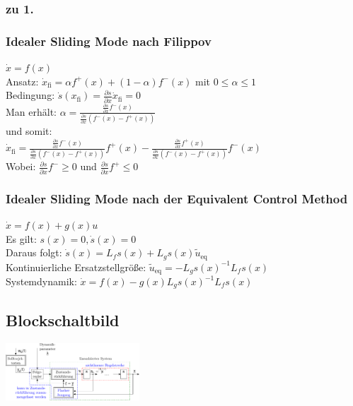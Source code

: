 \documentclass[german]{latex4ei/latex4ei_sheet}
\begin{document}
\begin{sectionbox}
\subsubsection{zu 1.}


\subsubsection{Idealer Sliding Mode nach Filippov}
$\dot{x} = f(x)$\\
Ansatz: $\dot{x}_\text{fi} = \alpha f^+(x) + (1-\alpha) f^-(x)$ mit $0 \leq \alpha \leq 1$ \\
Bedingung: $\dot{s}(x_\text{fi}) = \frac{\partial s}{\partial x} \dot{x}_\text{fi} = 0$ \\
Man erhält: $\alpha = \frac{ \frac{\partial s}{\partial x} f^-(x)  }{ \frac{\partial s}{\partial x} (f^-(x) - f^+(x))  }$ \\
und somit:\\ $\dot{x}_\text{fi} = \frac{ \frac{\partial s}{\partial x} f^-(x)  }{ \frac{\partial s}{\partial x} (f^-(x) - f^+(x)) } f^+(x) -
\frac{ \frac{\partial s}{\partial x} f^+(x)  }{ \frac{\partial s}{\partial x} (f^-(x) - f^+(x)) } f^-(x)$ \\
Wobei: $\frac{\partial s}{\partial x}f^- \geq 0$ und $\frac{\partial s}{\partial x}f^+ \leq 0$ \\

\subsubsection{Idealer Sliding Mode nach der Equivalent Control Method}
$\dot{x} = f(x) + g(x)u$ \\
Es gilt: $s(x) = 0, \dot{s}(x) = 0$ \\
Daraus folgt: $\dot{s}(x) = L_f s(x) + L_g s(x) \tilde{u}_\text{eq}$ \\
Kontinuierliche Ersatzstellgröße: $\tilde{u}_\text{eq} = -L_g s(x) ^{-1} L_f s(x)$ \\
Systemdynamik: $\dot{x} = f(x) - g(x) L_g s(x)^{-1} L_f s(x)$
\end{sectionbox}

\begin{sectionbox}
\subsection{Blockschaltbild}
\includegraphics[angle=90, width=5cm]{./img/block.pdf}
\end{sectionbox}
\end{document}

